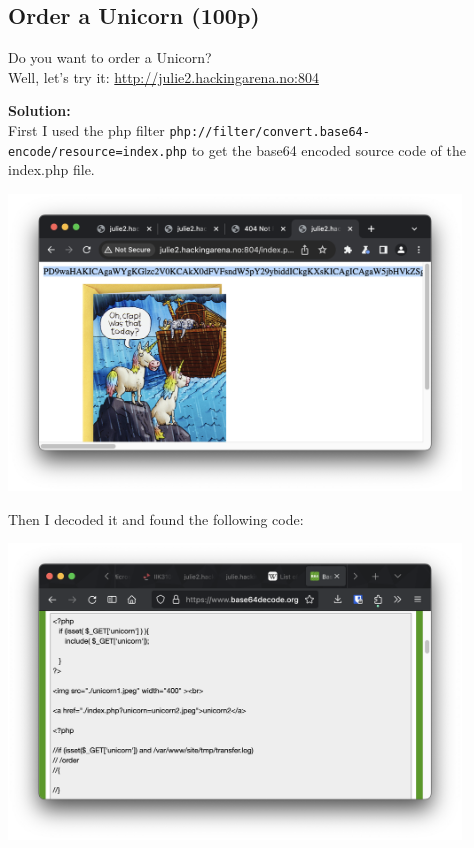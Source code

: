 \newpage
\subsection{Order a Unicorn (100p)}
\addtocounter{points}{100}
Do you want to order a Unicorn?
\\Well, let's try it: \url{http://julie2.hackingarena.no:804}

\textbf{Solution:}\\
First I used the php filter \texttt{php://filter/convert.base64-encode/resource=index.php} to get the base64 encoded source code of the index.php file. 

\begin{center}
    \includegraphics[width=12cm]{img/Web hacking/Order a Unicorn/Screenshot 2023-11-24 at 12.54.35.png}
\end{center}

Then I decoded it and found the following code:

\begin{center}
    \includegraphics[width=12cm]{img/Web hacking/Order a Unicorn/Screenshot 2023-11-24 at 12.54.54.png}
\end{center}

